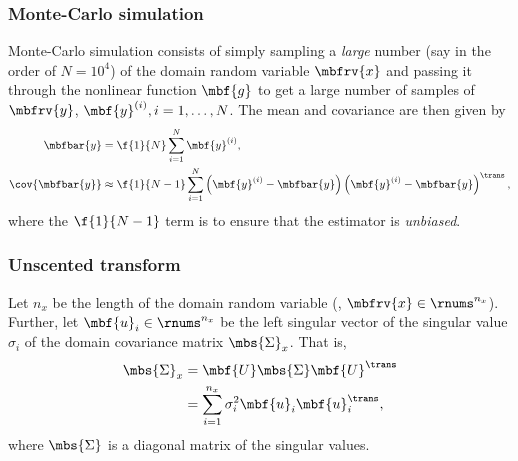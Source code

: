 \subsubsection{Monte-Carlo simulation}
Monte-Carlo simulation consists of simply sampling a \emph{large} number (say in the order of $N=10^{4}$) of the domain random variable $\mbfrv{x}$ and passing it through the nonlinear function $\mbf{g}$ to get a large number of samples of $\mbfrv{y}$, $\mbf{y}^{(i)}, i=1,\ldots,N$. The mean and covariance are then given by  
\begin{align}
    \mbfbar{y} &= \f{1}{N}\sum_{i=1}^{N}\mbf{y}^{(i)}, \\
    \cov{\mbfbar{y}} &\approx \f{1}{N-1}\sum_{i=1}^{N}\left( \mbf{y}^{(i)}-\mbfbar{y} \right)\left( \mbf{y}^{(i)}-\mbfbar{y} \right)^{\trans},
\end{align}
where the $\f{1}{N-1}$ term is to ensure that the estimator is \emph{unbiased}.

\subsubsection{Unscented transform}
Let $n_{x}$ be the length of the domain random variable (\ie, $\mbfrv{x}\in\rnums^{n_{x}}$). Further, let $\mbf{u}_{i}\in\rnums^{n_{x}}$ be the left singular vector of the singular value $\sigma_{i}$ of the domain covariance matrix $\mbs{\Sigma}_{x}$. That is, 
\begin{align}
    \mbs{\Sigma}_{x} &= \mbf{U}\mbs{\Sigma}\mbf{U}^{\trans}\\
    &= \sum_{i=1}^{n_{x}} \sigma_{i}^{2}\mbf{u}_{i}\mbf{u}_{i}^{\trans},
\end{align}
where $\mbs{\Sigma}$ is a diagonal matrix of the singular values.

